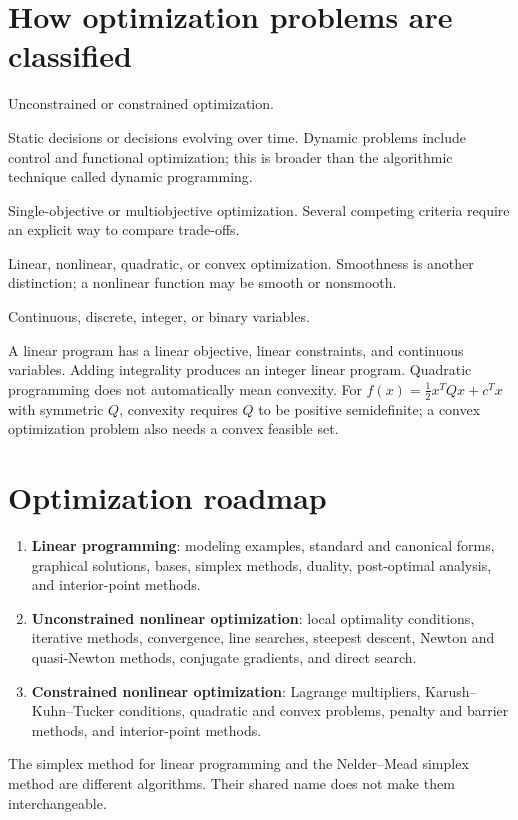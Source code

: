 \documentclass[11pt,a4paper]{article}
\begin{document}
\section{How optimization problems are classified}\label{sec:classification}
\begin{description}[leftmargin=2em,style=nextline]
  \item[Constraints] Unconstrained or constrained optimization.
  \item[Variables over time] Static decisions or decisions evolving over time.
        Dynamic problems include control and functional optimization;
        this is broader than the algorithmic technique called dynamic programming.
  \item[Number of objectives] Single-objective or multiobjective optimization.
        Several competing criteria require an explicit way to compare trade-offs.
  \item[Function structure] Linear, nonlinear, quadratic, or convex optimization.
        Smoothness is another distinction; a nonlinear function may be smooth or nonsmooth.
  \item[Allowed values] Continuous, discrete, integer, or binary variables.
\end{description}
A linear program has a linear objective, linear
constraints, and continuous variables. Adding integrality produces an integer
linear program. Quadratic programming does not automatically mean convexity.
For $f(x)=\tfrac12x^TQx+c^Tx$ with symmetric $Q$, convexity requires $Q$ to be
positive semidefinite; a convex optimization problem also needs a convex feasible set.

\section{Optimization roadmap}\label{sec:roadmap}
\begin{enumerate}[leftmargin=1.8em]
  \item \textbf{Linear programming}: modeling examples, standard and canonical
        forms, graphical solutions, bases, simplex methods, duality, post-optimal analysis,
        and interior-point methods.
  \item \textbf{Unconstrained nonlinear optimization}: local optimality conditions,
        iterative methods, convergence, line searches, steepest descent, Newton and
        quasi-Newton methods, conjugate gradients, and direct search.
  \item \textbf{Constrained nonlinear optimization}: Lagrange multipliers,
        Karush--Kuhn--Tucker conditions, quadratic and convex problems, penalty and barrier
        methods, and interior-point methods.
\end{enumerate}
The simplex method for linear programming and the Nelder--Mead simplex method
are different algorithms. Their shared name does not make them interchangeable.
\end{document}
